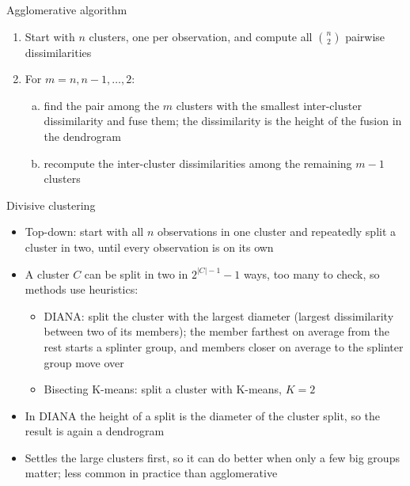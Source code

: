 \begin{frame}{Agglomerative algorithm}
    \begin{enumerate}
        \item Start with $n$ clusters, one per observation, and compute all $\binom{n}{2}$ pairwise dissimilarities
        \item For $m = n, n-1, \dots, 2$:
            \begin{enumerate}[(a)]
                \item find the pair among the $m$ clusters with the smallest inter-cluster dissimilarity and fuse them; the dissimilarity is the height of the fusion in the dendrogram
                \item recompute the inter-cluster dissimilarities among the remaining $m - 1$ clusters
            \end{enumerate}
    \end{enumerate}
\end{frame}

\begin{frame}{Divisive clustering}
    \begin{itemize}
        \item Top-down: start with all $n$ observations in one cluster and repeatedly split a cluster in two, until every observation is on its own
        \item A cluster $C$ can be split in two in $2^{|C|-1} - 1$ ways, too many to check, so methods use heuristics:
            \begin{itemize}
                \item DIANA: split the cluster with the largest diameter (largest dissimilarity between two of its members); the member farthest on average from the rest starts a splinter group, and members closer on average to the splinter group move over
                \item Bisecting K-means: split a cluster with K-means, $K = 2$
            \end{itemize}
        \item In DIANA the height of a split is the diameter of the cluster split, so the result is again a dendrogram
        \item Settles the large clusters first, so it can do better when only a few big groups matter; less common in practice than agglomerative
    \end{itemize}
\end{frame}

